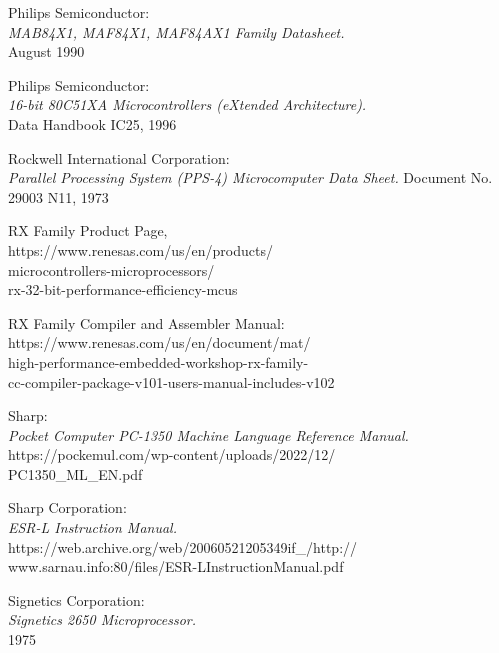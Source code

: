  Philips Semiconductor: \\
                 {\em MAB84X1, MAF84X1, MAF84AX1 Family Datasheet.} \\
                 August 1990

 Philips Semiconductor: \\
                 {\em 16-bit 80C51XA Microcontrollers (eXtended
                  Architecture).\/} \\
                 Data Handbook IC25, 1996

 Rockwell International Corporation: \\
                  {\em Parallel Processing System (PPS-4) Microcomputer Data Sheet.}
                 Document No. 29003 N11, 1973

 RX Family Product Page, \\
                 https://www.renesas.com/us/en/products/ \\
                 microcontrollers-microprocessors/ \\
                 rx-32-bit-performance-efficiency-mcus

 RX Family Compiler and Assembler Manual: \\
                 https://www.renesas.com/us/en/document/mat/ \\
                 high-performance-embedded-workshop-rx-family-\\
                 cc-compiler-package-v101-users-manual-includes-v102

 Sharp: \\
                 {\em Pocket Computer PC-1350 Machine Language Reference Manual.} \\
                 https://pockemul.com/wp-content/uploads/2022/12/ \\
                 PC1350\_ML\_EN.pdf

 Sharp Corporation: \\
                 {\em ESR-L Instruction Manual.} \\
                 https://web.archive.org/web/20060521205349if\_/http:// \\
                 www.sarnau.info:80/files/ESR-LInstructionManual.pdf

 Signetics Corporation: \\
                 {\em Signetics 2650 Microprocessor.} \\
                 1975

